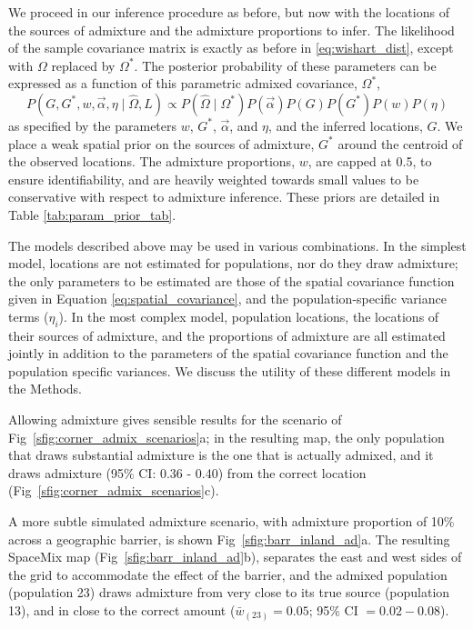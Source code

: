 \documentclass[10pt,letterpaper]{article}
\newcommand{\identifyadmixsource}[1]{{#1^{*}}}
\begin{document}
We proceed in our inference procedure as before, but now with the locations of the sources of admixture and the admixture proportions to infer.
The likelihood of the sample covariance matrix is exactly as before in \eqref{eq:wishart_dist},
except with $\Omega$ replaced by $\identifyadmixsource{\Omega}$.
The posterior probability of these parameters can be expressed as a function of this parametric admixed covariance, $\identifyadmixsource{\Omega}$,
\begin{equation}
\label{eq:admixed_post_prob}
P(G,\identifyadmixsource{G}, w,\vec{\alpha}, \eta \mid \widehat{\Omega}, L) 
	\propto  
		P(\widehat{\Omega}  \mid \identifyadmixsource{\Omega}) P(\vec{\alpha}) P(G) P(\identifyadmixsource{G}) P(w) P(\eta) 
\end{equation}
as specified by the parameters $w$, $\identifyadmixsource{G}$, $\vec{\alpha}$, and $\eta$, and the inferred locations, $G$.  
We place a weak spatial prior on the sources of admixture, $\identifyadmixsource{G}$ around the centroid of the observed locations. The admixture proportions, $w$, are capped at 0.5, to ensure identifiability,
and are heavily weighted towards small values to be conservative with respect to admixture inference.  
These priors are detailed in Table \ref{tab:param_prior_tab}.

The models described above may be used in various combinations.  In the simplest model, locations are not estimated for populations, nor do they draw admixture; the only parameters to be estimated are those of the spatial covariance function given in Equation \eqref{eq:spatial_covariance}, and the population-specific variance terms ($\eta_i$).  In the most complex model, population locations, the locations of their sources of admixture, and the proportions of admixture are all estimated jointly in addition to the parameters of the spatial covariance function and the population specific variances.  We discuss the utility of these different models in the Methods.

Allowing admixture gives sensible results for the scenario of Fig\ \ref{sfig:corner_admix_scenarios}a;
in the resulting map,
the only population that draws substantial admixture is the one that is actually admixed, 
and it draws admixture (95\% CI: 0.36 - 0.40) from the correct location (Fig\ \ref{sfig:corner_admix_scenarios}c).

A more subtle simulated admixture scenario, with admixture proportion of 10\% across a geographic barrier, 
is shown Fig\ \ref{sfig:barr_inland_ad}a.  
The resulting SpaceMix map (Fig\ \ref{sfig:barr_inland_ad}b), 
separates the east and west sides of the grid to accommodate the effect of the barrier,
and the admixed population (population 23) draws admixture from very close to its true source (population 13), 
and in close to the correct amount ($\bar{w}_{(23)} = 0.05$; 95\% CI $= 0.02-0.08$).
\end{document}
